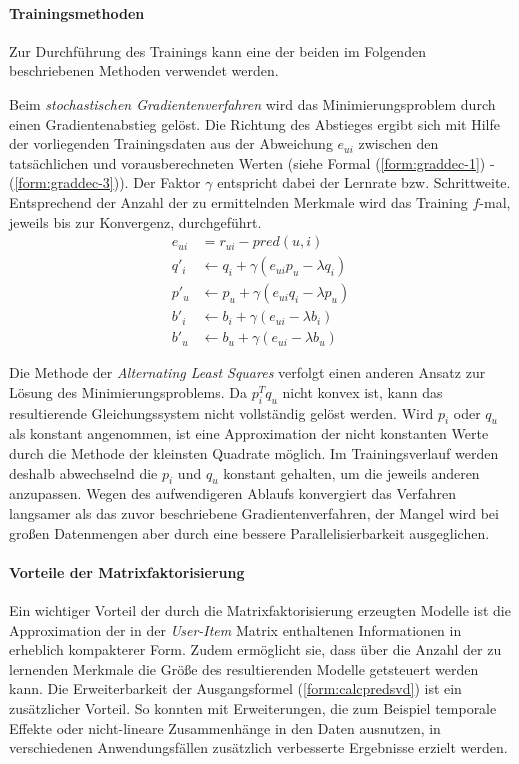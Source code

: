 \paragraph{Trainingsmethoden} Zur Durchführung des Trainings kann eine der beiden im Folgenden beschriebenen Methoden verwendet werden.

Beim \textit{stochastischen Gradientenverfahren} \citep{funk2006} wird das Minimierungsproblem durch einen Gradientenabstieg gelöst. Die Richtung des Abstieges  ergibt sich mit Hilfe der vorliegenden Trainingsdaten aus der Abweichung $e_{ui}$ zwischen den tatsächlichen und vorausberechneten Werten (siehe Formal (\ref{form:graddec-1}) - (\ref{form:graddec-3})). Der Faktor $\gamma$ entspricht dabei der Lernrate bzw. Schrittweite. Entsprechend der Anzahl der zu ermittelnden Merkmale wird das Training $f$-mal, jeweils bis zur Konvergenz, durchgeführt. \citep{funk2006,Langford09,hb_05}
\begin{align}
e_{ui} & =  r_{ui} - pred(u,i) \label{form:graddec-1} \\
q'_i & \gets q_i + \gamma (e_{ui} p_u - \lambda q_i ) \label{form:graddec-2} \\
p'_u & \gets p_u + \gamma (e_{ui} q_i - \lambda p_u) \\
b'_i & \gets b_i + \gamma (e_{ui} - \lambda b_i) \\
b'_u & \gets b_u + \gamma (e_{ui} - \lambda b_u) \label{form:graddec-3}
\end{align}

Die Methode der \textit{Alternating Least Squares} \citep{Bell:2007:SCF:1441428.1442050} verfolgt einen anderen Ansatz zur Lösung des Minimierungsproblems. Da $ p_i^T q_u $ nicht konvex ist, kann das resultierende Gleichungssystem nicht vollständig gelöst werden. Wird $p_i$ oder $q_u$ als konstant angenommen, ist eine Approximation der nicht konstanten Werte durch die Methode der kleinsten Quadrate möglich. Im Trainingsverlauf werden deshalb abwechselnd die $p_i$ und $q_u$ konstant gehalten, um die jeweils anderen anzupassen. Wegen des aufwendigeren Ablaufs konvergiert das Verfahren langsamer als das zuvor beschriebene Gradientenverfahren, der Mangel wird bei großen Datenmengen aber durch eine bessere Parallelisierbarkeit ausgeglichen. \citep{Bell:2007:SCF:1441428.1442050, hb_05} %

\paragraph{Vorteile der Matrixfaktorisierung} Ein wichtiger Vorteil der durch die Matrixfaktorisierung erzeugten Modelle ist die Approximation der in der \textit{User-Item} Matrix enthaltenen Informationen in erheblich kompakterer Form. Zudem ermöglicht sie, dass über die Anzahl der zu lernenden Merkmale die Größe des resultierenden Modelle getsteuert werden kann. Die Erweiterbarkeit der Ausgangsformel (\ref{form:calcpredsvd}) ist ein zusätzlicher Vorteil. So konnten mit Erweiterungen, die zum Beispiel temporale Effekte oder nicht-lineare Zusammenhänge in den Daten ausnutzen, in verschiedenen Anwendungsfällen zusätzlich verbesserte Ergebnisse erzielt werden. \citep{hb_05,Vozalis:2007:USD:1243505.1243639}

